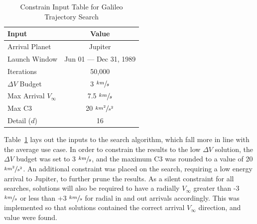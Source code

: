 \documentclass[letterpaper, paper,11pt]{AAS}	%
\begin{document}
\begin{table}[htb]
    \centering
    \caption{Constrain Input Table for Galileo Trajectory Search}
    \label{table:galiInputs}
    \begin{tabular}{lc}
        \toprule
        \textbf{Input} & \textbf{Value}\\
        \midrule
        Arrival Planet & Jupiter \\
        Launch Window & Jun 01 --- Dec 31, 1989 \\
        Iterations & 50,000 \\
        $\Delta V$ Budget & 3 $\sfrac{km}{s}$ \\
        Max Arrival $V_{\infty}$ & 7.5 $\sfrac{km}{s}$  \\
        Max C3 & 20 $\sfrac{km^2}{s^2}$ \\
        Detail ($d$) & 16 \\
        \bottomrule
    \end{tabular}
\end{table}

Table~\ref*{table:galiInputs} lays out the inputs to the search algorithm, which fall more in line with the average use case. In order to constrain the results to the low $\Delta V$ solution, the $\Delta V$ budget was set to 3 $\sfrac{km}{s}$, and the maximum C3 was rounded to a value of 20 $\sfrac{km^2}{s^2}$. An additional constraint was placed on the search, requiring a low energy arrival to Jupiter, to further prune the results. As a silent constraint for all searches, solutions will also be required to have a radially $V_\infty$ greater than -3 $\sfrac{km}{s}$ or less than +3 $\sfrac{km}{s}$ for radial in and out arrivals accordingly. This was implemented so that solutions contained the correct arrival $V_\infty$ direction, and value were found.
\end{document}
